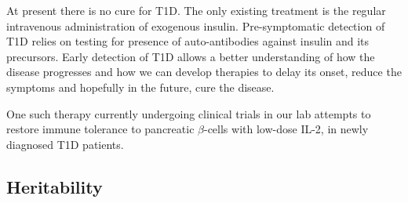 At present there is no cure for \gls{T1D}.
The only existing treatment is the regular intravenous administration of exogenous insulin.  
Pre-symptomatic detection of T1D relies on testing for presence of auto-antibodies against insulin and its precursors.
Early detection of T1D allows a better understanding of how the disease progresses and how we can develop therapies to delay its onset,
reduce the symptoms and hopefully in the future, cure the disease.  

One such therapy currently undergoing clinical trials in our lab attempts to restore immune tolerance to pancreatic $\beta$-cells with low-dose \Gls{IL-2},
in newly diagnosed \gls{T1D} patients.


\subsection{Heritability}


